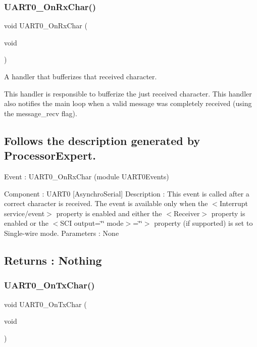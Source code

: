\subsubsection{\texorpdfstring{U\+A\+R\+T0\+\_\+\+On\+Rx\+Char()}{UART0\_OnRxChar()}}
{\footnotesize\ttfamily void U\+A\+R\+T0\+\_\+\+On\+Rx\+Char (\begin{DoxyParamCaption}\item[{void}]{ }\end{DoxyParamCaption})}



A handler that bufferizes that received character. 

This handler is responsible to bufferize the just received character. This handler also notifies the main loop when a valid message was completely received (using the message\+\_\+recv flag).

\subsection*{Follows the description generated by Processor\+Expert. }

Event \+: U\+A\+R\+T0\+\_\+\+On\+Rx\+Char (module U\+A\+R\+T0\+Events)

Component \+: U\+A\+R\+T0 \mbox{[}Asynchro\+Serial\mbox{]} Description \+: This event is called after a correct character is received. The event is available only when the $<$Interrupt service/event$>$ property is enabled and either the $<$\+Receiver$>$ property is enabled or the $<$\+S\+C\+I output=\char`\"{}\char`\"{} mode$>$=\char`\"{}\char`\"{}$>$ property (if supported) is set to Single-\/wire mode. Parameters \+: None \subsection*{Returns \+: Nothing }\mbox{\label{group___u_a_r_t0_events__module_ga96b3fd9eb4bbaf0ad2eb012cd3738ed0}} 
\subsubsection{\texorpdfstring{U\+A\+R\+T0\+\_\+\+On\+Tx\+Char()}{UART0\_OnTxChar()}}
{\footnotesize\ttfamily void U\+A\+R\+T0\+\_\+\+On\+Tx\+Char (\begin{DoxyParamCaption}\item[{void}]{ }\end{DoxyParamCaption})}



